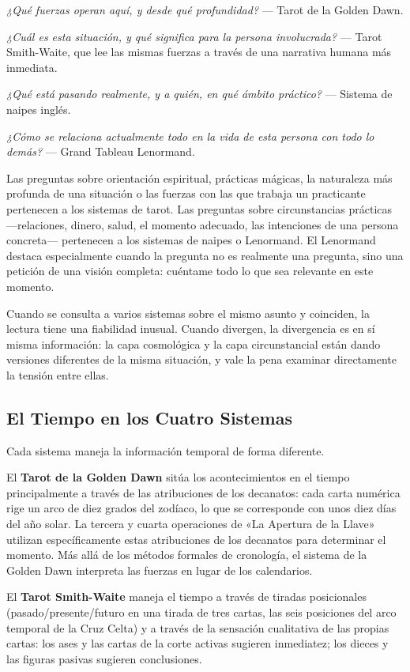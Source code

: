 \emph{¿Qué fuerzas operan aquí, y desde qué profundidad?} --- Tarot de la Golden Dawn.

\emph{¿Cuál es esta situación, y qué significa para la persona involucrada?} --- Tarot Smith-Waite, que lee las mismas fuerzas a través de una narrativa humana más inmediata.

\emph{¿Qué está pasando realmente, y a quién, en qué ámbito práctico?} --- Sistema de naipes inglés.

\emph{¿Cómo se relaciona actualmente todo en la vida de esta persona con todo lo demás?} --- Grand Tableau Lenormand.

Las preguntas sobre orientación espiritual, prácticas mágicas, la naturaleza más profunda de una situación o las fuerzas con las que trabaja un practicante pertenecen a los sistemas de tarot. Las preguntas sobre circunstancias prácticas ---relaciones, dinero, salud, el momento adecuado, las intenciones de una persona concreta--- pertenecen a los sistemas de naipes o Lenormand. El Lenormand destaca especialmente cuando la pregunta no es realmente una pregunta, sino una petición de una visión completa: cuéntame todo lo que sea relevante en este momento.

Cuando se consulta a varios sistemas sobre el mismo asunto y coinciden, la lectura tiene una fiabilidad inusual. Cuando divergen, la divergencia es en sí misma información: la capa cosmológica y la capa circunstancial están dando versiones diferentes de la misma situación, y vale la pena examinar directamente la tensión entre ellas.

\subsection{El Tiempo en los Cuatro Sistemas}\label{time-across-the-four-systems}

Cada sistema maneja la información temporal de forma diferente.

El \textbf{Tarot de la Golden Dawn} sitúa los acontecimientos en el tiempo principalmente a través de las atribuciones de los decanatos: cada carta numérica rige un arco de diez grados del zodíaco, lo que se corresponde con unos diez días del año solar. La tercera y cuarta operaciones de «La Apertura de la Llave» utilizan específicamente estas atribuciones de los decanatos para determinar el momento. Más allá de los métodos formales de cronología, el sistema de la Golden Dawn interpreta las fuerzas en lugar de los calendarios.

El \textbf{Tarot Smith-Waite} maneja el tiempo a través de tiradas posicionales (pasado/presente/futuro en una tirada de tres cartas, las seis posiciones del arco temporal de la Cruz Celta) y a través de la sensación cualitativa de las propias cartas: los ases y las cartas de la corte activas sugieren inmediatez; los dieces y las figuras pasivas sugieren conclusiones.


